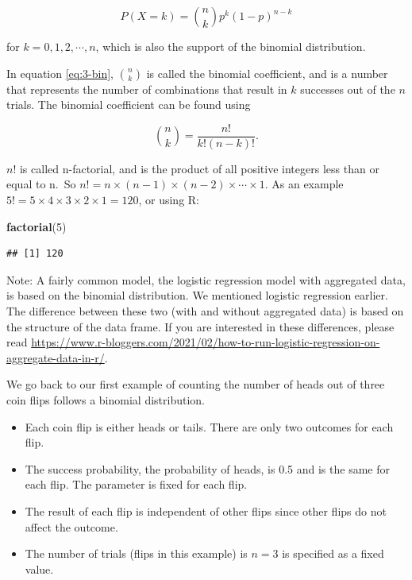 \documentclass[
]{book}
\newenvironment{Shaded}{\begin{snugshade}}{\end{snugshade}}
\newcommand{\DecValTok}[1]{\textcolor[rgb]{0.00,0.00,0.81}{#1}}
\newcommand{\FunctionTok}[1]{\textcolor[rgb]{0.13,0.29,0.53}{\textbf{#1}}}
\newcommand{\NormalTok}[1]{#1}
\providecommand{\tightlist}{%
  \setlength{\itemsep}{0pt}\setlength{\parskip}{0pt}}
\begin{document}
\begin{equation} 
P(X=k) = \binom{n}{k} p^k (1-p)^{n-k}
\label{eq:3-bin}
\end{equation}

for \(k=0,1,2, \cdots, n\), which is also the support of the binomial distribution.

In equation \eqref{eq:3-bin}, \(\binom{n}{k}\) is called the binomial coefficient, and is a number that represents the number of combinations that result in \(k\) successes out of the \(n\) trials. The binomial coefficient can be found using

\begin{equation} 
\binom{n}{k} =  \frac{n!}{k! (n-k)!}.
\label{eq:3-bincoeff}
\end{equation}

\(n!\) is called n-factorial, and is the product of all positive integers less than or equal to n.~So \(n! = n \times (n-1) \times (n-2) \times \cdots \times 1.\) As an example \(5! = 5 \times 4 \times 3 \times 2 \times 1 = 120\), or using R:

\begin{Shaded}
\begin{Highlighting}[]
\FunctionTok{factorial}\NormalTok{(}\DecValTok{5}\NormalTok{)}
\end{Highlighting}
\end{Shaded}

\begin{verbatim}
## [1] 120
\end{verbatim}

Note: A fairly common model, the logistic regression model with aggregated data, is based on the binomial distribution. We mentioned logistic regression earlier. The difference between these two (with and without aggregated data) is based on the structure of the data frame. If you are interested in these differences, please read \url{https://www.r-bloggers.com/2021/02/how-to-run-logistic-regression-on-aggregate-data-in-r/}.

We go back to our first example of counting the number of heads out of three coin flips follows a binomial distribution.

\begin{itemize}
\tightlist
\item
  Each coin flip is either heads or tails. There are only two outcomes for each flip.
\item
  The success probability, the probability of heads, is 0.5 and is the same for each flip. The parameter is fixed for each flip.
\item
  The result of each flip is independent of other flips since other flips do not affect the outcome.
\item
  The number of trials (flips in this example) is \(n=3\) is specified as a fixed value.
\end{itemize}
\end{document}

